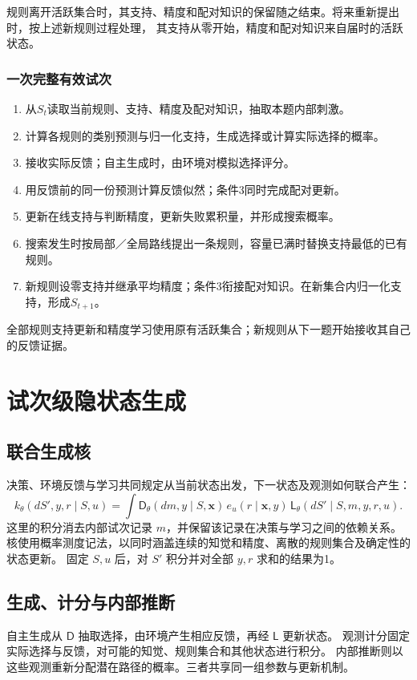 \documentclass[11pt,a4paper]{article}
\numberwithin{equation}{section}
\newcommand{\Dd}{\mathsf{D}}
\newcommand{\Ll}{\mathsf{L}}
\begin{document}
规则离开活跃集合时，其支持、精度和配对知识的保留随之结束。将来重新提出时，按上述新规则过程处理，
其支持从零开始，精度和配对知识来自届时的活跃状态。

\subsubsection{一次完整有效试次}
\begin{enumerate}
\item 从$S_t$读取当前规则、支持、精度及配对知识，抽取本题内部刺激。
\item 计算各规则的类别预测与归一化支持，生成选择或计算实际选择的概率。
\item 接收实际反馈；自主生成时，由环境对模拟选择评分。
\item 用反馈前的同一份预测计算反馈似然；条件3同时完成配对更新。
\item 更新在线支持与判断精度，更新失败累积量，并形成搜索概率。
\item 搜索发生时按局部／全局路线提出一条规则，容量已满时替换支持最低的已有规则。
\item 新规则设零支持并继承平均精度；条件3衔接配对知识。在新集合内归一化支持，形成$S_{t+1}$。
\end{enumerate}
全部规则支持更新和精度学习使用原有活跃集合；新规则从下一题开始接收其自己的反馈证据。

\section{试次级隐状态生成}
\label{sec:kernel}

\subsection{联合生成核}
决策、环境反馈与学习共同规定从当前状态出发，下一状态及观测如何联合产生：
\begin{equation}
k_\theta(dS',y,r\mid S,u)=
\int \Dd_\theta(dm,y\mid S,\bm x)\,
e_u(r\mid\bm x,y)\,
\Ll_\theta(dS'\mid S,m,y,r,u).
\label{eq:kernel}
\end{equation}
这里的积分消去内部试次记录 $m$，并保留该记录在决策与学习之间的依赖关系。
核使用概率测度记法，以同时涵盖连续的知觉和精度、离散的规则集合及确定性的状态更新。
固定 $S,u$ 后，对 $S'$ 积分并对全部 $y,r$ 求和的结果为1。

\subsection{生成、计分与内部推断}
自主生成从 $\Dd$ 抽取选择，由环境产生相应反馈，再经 $\Ll$ 更新状态。
观测计分固定实际选择与反馈，对可能的知觉、规则集合和其他状态进行积分。
内部推断则以这些观测重新分配潜在路径的概率。三者共享同一组参数与更新机制。
\end{document}
